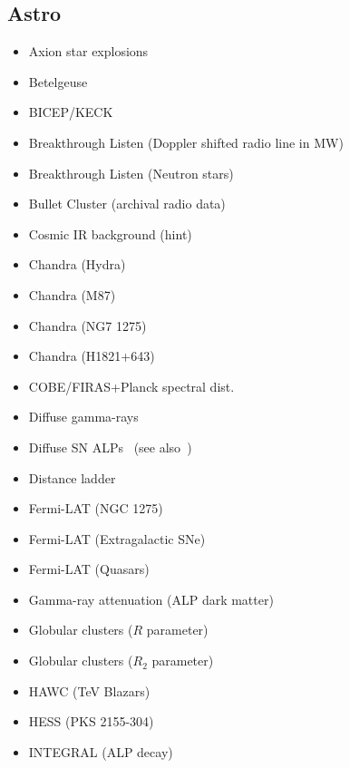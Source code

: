 \documentclass[9pt,twocolumn]{extarticle}
\begin{document}
\begin{mdframed}[everyline=true]
\subsection*{Astro}\vspace{-0.5em}
\begin{itemize}\setlength\itemsep{-0.5em}
	\item Axion star explosions~\cite{Escudero:2023vgv}
	\item Betelgeuse~\cite{Xiao:2020pra}
	\item BICEP/KECK~\cite{BICEPKeck:2021sbt}
	\item Breakthrough Listen (Doppler shifted radio line in MW)~\cite{Keller:2021zbl}
	\item Breakthrough Listen (Neutron stars)~\cite{Foster:2022fxn}
    \item Bullet Cluster (archival radio data)~\cite{Chan:2021gjl}
  	\item Cosmic IR background (hint)~\cite{Kohri:2017ljt}
    \item Chandra (Hydra)~\cite{Wouters:2013hua}
    \item Chandra (M87)~\cite{Marsh:2017yvc}
    \item Chandra (NG7 1275)~\cite{Reynolds:2019uqt}
    \item Chandra (H1821+643)~\cite{Reynes:2021bpe}
    \item COBE/FIRAS+Planck spectral dist.~\cite{Bolliet:2020ofj}
    \item Diffuse gamma-rays~\cite{Caputo:2022mah}
    \item Diffuse SN ALPs~\cite{Calore:2021hhn} (see also~\cite{Calore:2020tjw})
    \item Distance ladder~\cite{Buen-Abad:2020zbd}
    \item Fermi-LAT (NGC 1275)~\cite{Fermi-LAT:2016nkz}
    \item Fermi-LAT (Extragalactic SNe)~\cite{Meyer:2020vzy}
   	\item Fermi-LAT (Quasars)~\cite{Davies:2022wvj}
   	\item Gamma-ray attenuation (ALP dark matter)~\cite{Bernal:2022xyi}
    \item Globular clusters ($R$ parameter)~\cite{Ayala:2014pea}
    \item Globular clusters ($R_2$ parameter)~\cite{Dolan:2022kul}
    \item HAWC (TeV Blazars)~\cite{Jacobsen:2022swa}
    \item HESS (PKS 2155-304)~\cite{HESS:2013udx}
    \item INTEGRAL (ALP decay)~\cite{Calore:2022pks}

\end{itemize}
\end{mdframed}
\end{document}
